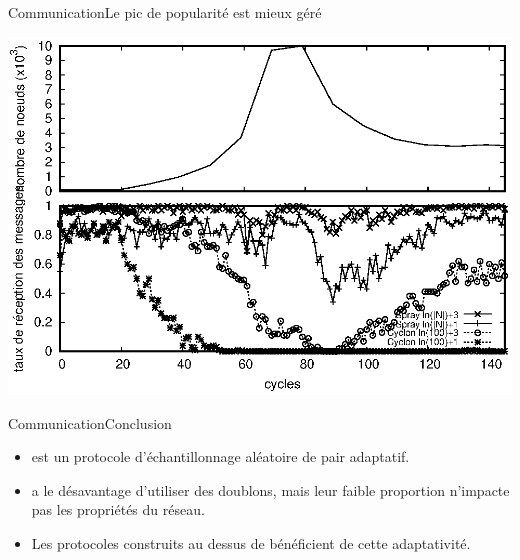 \begin{frame}{Communication}{Le pic de popularité est mieux géré}
  \begin{center}
    \includegraphics[width=1\textwidth]{img/network/peak.eps}
  \end{center} 
\end{frame}



\begin{frame}{Communication}{Conclusion}
  
  \begin{itemize}
  \item \SPRAY est un protocole d'échantillonnage aléatoire de pair adaptatif.
  \item \SPRAY a le désavantage d'utiliser des doublons, mais leur faible
    proportion n'impacte pas les propriétés du réseau.    
  \item Les protocoles construits au dessus de \SPRAY bénéficient de cette
    adaptativité.
  \end{itemize}

\end{frame}